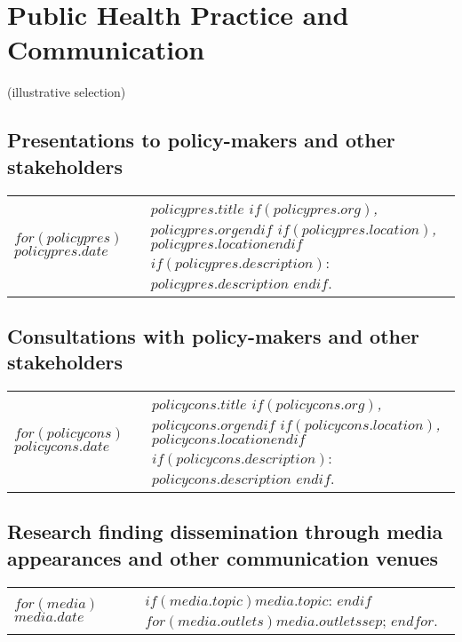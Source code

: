 \documentclass[martgin, line]{article}
\begin{document}

\section*{Public Health Practice and Communication}

(illustrative selection)

\subsection*{Presentations to policy-makers and other stakeholders}

\setlength{\extrarowheight}{.75em}
\begin{longtable}[l]{lp{5in}}   
$for(policypres)$
$policypres.date$&
\parbox[t]{5in}{
    \textit{$policypres.title$%
    $if(policypres.org)$, $policypres.org$$endif$%
    $if(policypres.location)$, $policypres.location$$endif$}%
    $if(policypres.description)$: %
    $policypres.description$%
    $endif$.%
  }\\
$endfor$
\end{longtable}
\setlength{\extrarowheight}{0em}

\subsection*{Consultations with policy-makers and other
  stakeholders}

\setlength{\extrarowheight}{.75em}
\begin{longtable}[l]{lp{5in}}   
$for(policycons)$
$policycons.date$&
\parbox[t]{5in}{
    \textit{$policycons.title$%
    $if(policycons.org)$, $policycons.org$$endif$%
    $if(policycons.location)$, $policycons.location$$endif$}%
    $if(policycons.description)$: %
    $policycons.description$%
    $endif$.%
  }\\
$endfor$
\end{longtable}
\setlength{\extrarowheight}{0em}

\subsection*{Research finding dissemination through media appearances
  and other communication venues}


\setlength{\extrarowheight}{.75em}
\begin{longtable}[l]{lp{5in}}   
$for(media)$
$media.date$&
\parbox[t]{5in}{
    $if(media.topic)$$media.topic$: $endif$%
    $for(media.outlets)$$media.outlets$$sep$; $endfor$.%
  }\\
$endfor$
\end{longtable}
\setlength{\extrarowheight}{0em}
\end{document}

